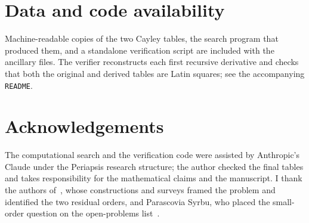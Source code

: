 \documentclass[11pt]{article}
\theoremstyle{definition}
\begin{document}
\section*{Data and code availability}
Machine-readable copies of the two Cayley tables, the search program that produced them,
and a standalone verification script are included with the ancillary files. The verifier
reconstructs each first recursive derivative and checks that both the original and derived
tables are Latin squares; see the accompanying \texttt{README}.

\section*{Acknowledgements}
The computational search and the verification code were assisted by Anthropic's Claude
under the Periapsis research structure; the author checked the final tables and takes
responsibility for the mathematical claims
and the manuscript. I thank the authors of~\cite{CGMN,MNST,Klimov}, whose constructions
and surveys framed the problem and identified the two residual orders, and Parascovia
Syrbu, who placed the small-order question on the open-problems list~\cite{KV}.
\end{document}
